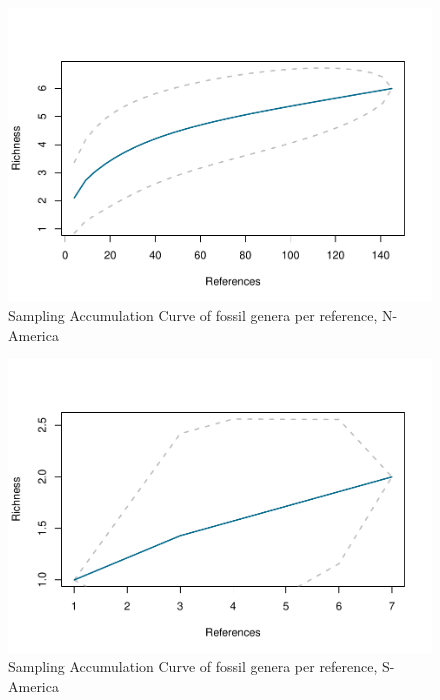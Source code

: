 \documentclass[]{article}
\begin{document}
\begin{figure}[htbp]
\centering
\includegraphics{MA_JJ_files/figure-latex/SACGNAmerica-1.pdf}
\caption{Sampling Accumulation Curve of fossil genera per reference,
N-America}
\end{figure}

\begin{figure}[htbp]
\centering
\includegraphics{MA_JJ_files/figure-latex/SACGSAmerica-1.pdf}
\caption{Sampling Accumulation Curve of fossil genera per reference,
S-America}
\end{figure}
\end{document}
